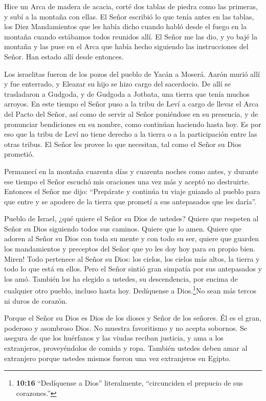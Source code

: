  Hice un Arca de madera de acacia, corté dos tablas de
piedra como las primeras, y subí a la montaña con ellas.  El
Señor escribió lo que tenía antes en las tablas, los Diez Mandamientos
que les había dicho cuando habló desde el fuego en la montaña cuando
estábamos todos reunidos allí. El Señor me las dio,  y yo
bajé la montaña y las puse en el Arca que había hecho siguiendo las
instrucciones del Señor. Han estado allí desde entonces.

 Los israelitas fueron de los pozos del pueblo de Yacán a
Moserá. Aarón murió allí y fue enterrado, y Eleazar su hijo se hizo
cargo del sacerdocio.  De allí se trasladaron a Gudgoda, y
de Gudgoda a Jotbata, una tierra que tenía muchos arroyos. 
En este tiempo el Señor puso a la tribu de Leví a cargo de llevar el
Arca del Pacto del Señor, así como de servir al Señor poniéndose en su
presencia, y de pronunciar bendiciones en su nombre, como continúan
haciendo hasta hoy.  Es por eso que la tribu de Leví no
tiene derecho a la tierra o a la participación entre las otras tribus.
El Señor les provee lo que necesitan, tal como el Señor su Dios
prometió.

 Permanecí en la montaña cuarenta días y cuarenta noches
como antes, y durante ese tiempo el Señor escuchó mis oraciones una vez
más y aceptó no destruirte.  Entonces el Señor me dijo:
``Prepárate y continúa tu viaje guiando al pueblo para que entre y se
apodere de la tierra que prometí a sus antepasados que les daría''.

 Pueblo de Israel, ¿qué quiere el Señor su Dios de ustedes?
Quiere que respeten al Señor su Dios siguiendo todos sus caminos. Quiere
que lo amen. Quiere que adoren al Señor su Dios con toda su mente y con
todo su ser,  quiere que guarden los mandamientos y
preceptos del Señor que yo les doy hoy para su propio bien.
 Miren! Todo pertenece al Señor su Dios: los cielos, los
cielos más altos, la tierra y todo lo que está en ellos. 
Pero el Señor sintió gran simpatía por sus antepasados y los amó.
También los ha elegido a ustedes, su descendencia, por encima de
cualquier otro pueblo, incluso hasta hoy.  Dedíquense a
Dios.\footnote{\textbf{10:16} ``Dedíquense a Dios'' literalmente,
  ``circunciden el prepucio de sus corazones.''}No sean más tercos ni
duros de corazón.

 Porque el Señor su Dios es Dios de los dioses y Señor de
los señores. Él es el gran, poderoso y asombroso Dios. No muestra
favoritismo y no acepta sobornos.  Se asegura de que los
huérfanos y las viudas reciban justicia, y ama a los extranjeros,
proveyéndolos de comida y ropa.  También ustedes deben amar
al extranjero porque ustedes mismos fueron una vez extranjeros en
Egipto.

